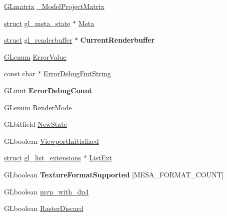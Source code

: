 \begin{DoxyCompactItemize}
\item 
\hyperlink{struct_g_lmatrix}{G\+Lmatrix} \hyperlink{structgl__context_a1dfc9b6e93931d47c5767c016dd099f1}{\+\_\+\+Model\+Project\+Matrix}
\item 
\hyperlink{interfacestruct}{struct} \hyperlink{structgl__meta__state}{gl\+\_\+meta\+\_\+state} $\ast$ \hyperlink{structgl__context_a2b873d30b560c7e6551cf1c171504ec0}{Meta}
\item 
\mbox{\label{structgl__context_a65075007f8937cf2df3e445ac16316cb}} 
\hyperlink{interfacestruct}{struct} \hyperlink{structgl__renderbuffer}{gl\+\_\+renderbuffer} $\ast$ {\bfseries Current\+Renderbuffer}
\item 
\hyperlink{interfacevoid}{G\+Lenum} \hyperlink{structgl__context_a49e26ac67855e06f51644dd62c47fb50}{Error\+Value}
\item 
const char $\ast$ \hyperlink{structgl__context_a82c1612f3a2e94b3a49a844838bcb917}{Error\+Debug\+Fmt\+String}
\item 
\mbox{\label{structgl__context_adc31f1b8ee2589e8640ac55a61c94f57}} 
G\+Luint {\bfseries Error\+Debug\+Count}
\item 
\hyperlink{interfacevoid}{G\+Lenum} \hyperlink{structgl__context_aa2ce1b2155bf1b5458e8ac16fd5dae14}{Render\+Mode}
\item 
G\+Lbitfield \hyperlink{structgl__context_ad9bbbbb426be7fd670dfd9470da9a890}{New\+State}
\item 
G\+Lboolean \hyperlink{structgl__context_ac3cf60bd521580b20b714ceef68659cd}{Viewport\+Initialized}
\item 
\hyperlink{interfacestruct}{struct} \hyperlink{structgl__list__extensions}{gl\+\_\+list\+\_\+extensions} $\ast$ \hyperlink{structgl__context_aba2e4cfb56b1246b62a464dbd0987012}{List\+Ext}
\item 
\mbox{\label{structgl__context_acf2a4c9c2a51dfe0cc4e3ab844608c2f}} 
G\+Lboolean {\bfseries Texture\+Format\+Supported} \mbox{[}M\+E\+S\+A\+\_\+\+F\+O\+R\+M\+A\+T\+\_\+\+C\+O\+U\+NT\mbox{]}
\item 
G\+Lboolean \hyperlink{structgl__context_a66e2340b482a6d5bf04f44c4a260a380}{mvp\+\_\+with\+\_\+dp4}
\item 
G\+Lboolean \hyperlink{structgl__context_afda14363ac59455b69f5f00c4f967054}{Raster\+Discard}
\end{DoxyCompactItemize}
